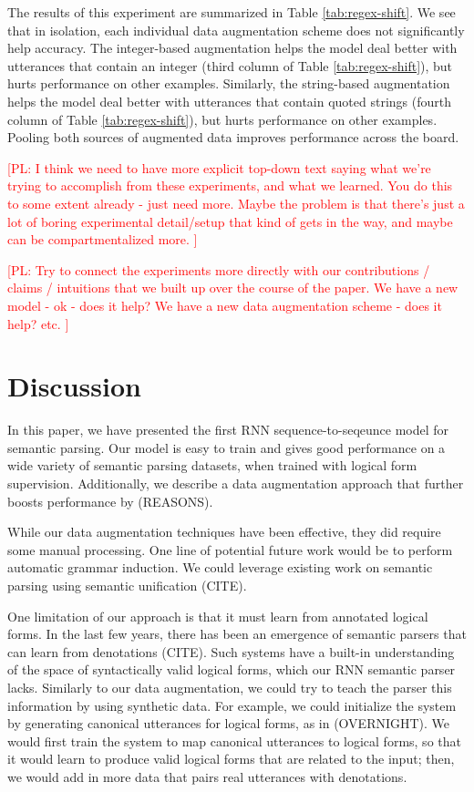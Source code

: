 \documentclass[11pt,letterpaper]{article}
\newcommand\pl[1]{\textcolor{red}{[PL: #1]}}
\begin{document}
The results of this experiment are summarized in Table \ref{tab:regex-shift}.
We see that in isolation, each individual data augmentation scheme
does not significantly help accuracy.
The integer-based augmentation helps the model deal better
with utterances that contain an integer 
(third column of Table \ref{tab:regex-shift}),
but hurts performance on other examples.
Similarly, the string-based augmentation helps the model
deal better with utterances that contain quoted strings 
(fourth column of Table \ref{tab:regex-shift}),
but hurts performance on other examples.
Pooling both sources of augmented data improves performance
across the board.

\pl{I think we need to have more explicit top-down text saying what we're
  trying to accomplish from these experiments, and what we learned.  You do
  this to some extent already - just need more.
  Maybe the problem is that there's just a lot of boring experimental detail/setup
  that kind of gets in the way, and maybe can be compartmentalized more.
}

\pl{
  Try to connect the experiments more directly with our contributions / claims
  / intuitions that we built up over the course of the paper.
  We have a new model - ok - does it help?
  We have a new data augmentation scheme - does it help?
  etc.
}

\section{Discussion}
In this paper, we have presented the first RNN sequence-to-seqeunce
model for semantic parsing.  Our model is easy to train
and gives good performance on a wide variety of semantic parsing
datasets, when trained with logical form supervision.
Additionally, we describe a data augmentation approach that 
further boosts performance by (REASONS).

While our data augmentation techniques have been effective,
they did require some manual processing.
One line of potential future work would be to
perform automatic grammar induction.
We could leverage existing work on semantic parsing
using semantic unification (CITE).

One limitation of our approach is that it must learn from annotated logical forms.
In the last few years, there has been an emergence of
semantic parsers that can learn from denotations (CITE).
Such systems have a built-in understanding of the space of
syntactically valid logical forms, which our RNN semantic parser lacks.
Similarly to our data augmentation, we could try to
teach the parser this information by using synthetic data.
For example, we could initialize the system 
by generating canonical utterances for logical forms,
as in (OVERNIGHT).  We would first train the system to map
canonical utterances to logical forms, so that it would learn to produce
valid logical forms that are related to the input;
then, we would add in more data that pairs real utterances with denotations.
\end{document}
